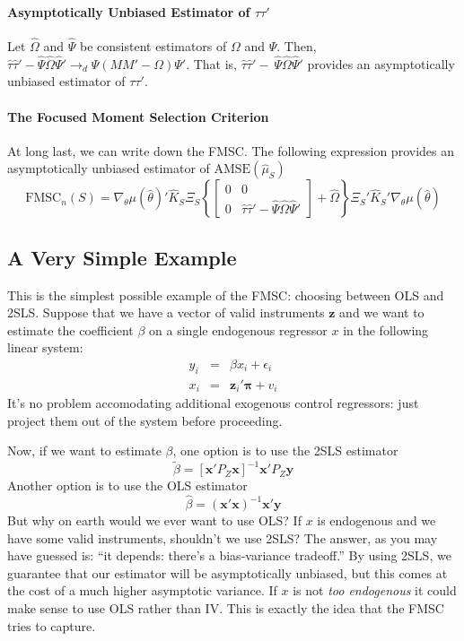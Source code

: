 \paragraph{Asymptotically Unbiased Estimator of $\tau\tau'$}
Let $\widehat{\Omega}$ and $\widehat{\Psi}$ be consistent estimators of $\Omega$ and $\Psi$. Then, $ \widehat{\tau}\widehat{\tau}' - \widehat{\Psi}\widehat{\Omega}\widehat{\Psi}' \rightarrow_d\Psi \left(MM' - \Omega\right)\Psi' $. That is, $\widehat{\tau}\widehat{\tau}' - \ \widehat{\Psi}\widehat{\Omega}\widehat{\Psi}' $ provides an asymptotically unbiased estimator of $\tau\tau'$.

\paragraph{The Focused Moment Selection Criterion} At long last, we can write down the FMSC. The following expression provides an asymptotically unbiased estimator of $\mbox{AMSE}(\widehat{\mu}_S)$
$$\mbox{FMSC}_n(S) = \nabla_\theta\mu(\widehat{\theta})'\widehat{K}_S\Xi_S \left\{\left[\begin{array}{cc}0&0\\0&\widehat{\tau}\widehat{\tau}' - \widehat{\Psi}\widehat{\Omega}\widehat{\Psi}'\end{array}\right] + \widehat{\Omega}\right\}\Xi_S'\widehat{K}_S' \nabla_\theta\mu(\widehat{\theta})$$

\subsection{A Very Simple Example}
This is the simplest possible example of the FMSC: choosing between OLS and 2SLS. Suppose that we have a vector of valid instruments $\mathbf{z}$ and we want to estimate the coefficient $\beta$ on a single endogenous regressor $x$ in the following linear system:
    	\begin{eqnarray*}
			y_{i} &=& \beta x_{i}  + \epsilon_{i}\\
	x_{i} &=& \mathbf{z}_{i}' \boldsymbol{\pi} + v_{i}
		\end{eqnarray*}
It's no problem accomodating additional exogenous control regressors: just project them out of the system before proceeding. 

Now, if we want to estimate $\beta$, one option is to use the 2SLS estimator
	$$\widetilde{\beta} = \left[ \textbf{x}'P_Z\textbf{x}\right]^{-1}\textbf{x}'P_Z \textbf{y}$$
Another option is to use the OLS estimator
	$$\widehat{\beta} = \left(\textbf{x}'\textbf{x} \right)^{-1}\textbf{x}'\textbf{y}$$
But why on earth would we ever want to use OLS? If $x$ is endogenous and we have some valid instruments, shouldn't we use 2SLS? The answer, as you may have guessed is: ``it depends: there's a bias-variance tradeoff.'' By using 2SLS, we guarantee that our estimator will be asymptotically unbiased, but this comes at the cost of a much higher asymptotic variance. If $x$ is not \emph{too endogenous} it could make sense to use OLS rather than IV. This is exactly the idea that the FMSC tries to capture.

